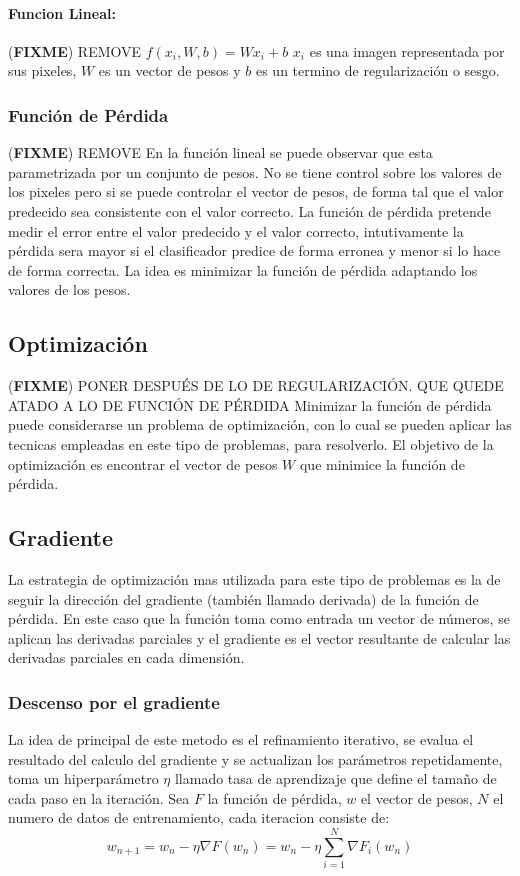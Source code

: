 \documentclass[a4paper,11pt,spanish]{book}
\newcommand*{\FIXME}[1]{{(\textbf{FIXME}) {#1}}}
\begin{document}
	\paragraph{Funcion Lineal:}\FIXME{REMOVE}
	  $f(x_i,W,b)=Wx_i+b$
	  $x_i$ es una imagen representada por sus pixeles, $W$ es un vector de pesos y $b$ es un termino de regularización o sesgo.

      \subsubsection{Función de Pérdida}\FIXME{REMOVE}
	En la función lineal se puede observar que esta parametrizada por un conjunto de pesos.
	No se tiene control sobre los valores de los pixeles pero si se puede controlar el vector de pesos, de forma tal que el valor predecido sea consistente con el valor correcto.
	La función de pérdida pretende medir el error entre el valor predecido y el valor correcto, intutivamente la pérdida sera mayor si el clasificador predice de forma erronea y
	menor si lo hace de forma correcta.
	La idea es minimizar la función de pérdida adaptando los valores de los pesos.

    \subsection{Optimización} \FIXME{PONER DESPUÉS DE LO DE REGULARIZACIÓN. QUE
      QUEDE ATADO A LO DE FUNCIÓN DE PÉRDIDA}
      Minimizar la función de pérdida puede considerarse un problema de optimización, con lo cual se pueden aplicar las tecnicas empleadas en este tipo de problemas, para resolverlo.
      El objetivo de la optimización es encontrar el vector de pesos $W$ que minimice la función de pérdida.

    \subsection{Gradiente}
      La estrategia de optimización mas utilizada para este tipo de problemas es la de seguir la dirección del gradiente (también llamado derivada) de la función de pérdida.
      En este caso que la función toma como entrada un vector de números, se aplican las derivadas parciales y el gradiente es el vector resultante de calcular las derivadas parciales
      en cada dimensión.

      \subsubsection{Descenso por el gradiente}
	La idea de principal de este metodo es el refinamiento iterativo, se evalua el resultado del calculo del gradiente y se actualizan los parámetros repetidamente,
	toma un hiperparámetro $\eta$ llamado tasa de aprendizaje que define el tamaño de cada paso en la iteración.
	Sea $F$ la función de pérdida, $w$ el vector de pesos, $N$ el numero de datos de entrenamiento, cada iteracion consiste de:
	\begin{equation}
	 w_{n+1} = w_n - \eta \nabla F(w_n)  = w_n - \eta \sum_{i=1}^{N} \nabla F_i(w_n)
	\end{equation}
\end{document}
